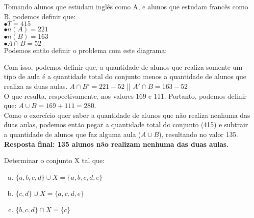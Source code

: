 \begin{solution}{}{}
    Tomando alunos que estudam inglês como A, e alunos que estudam francês como B, podemos definir que: \\
    $\bullet T = 415$ \\
    $\bullet  n(A)=221$ \\
    $\bullet n(B)=163$ \\
    $\bullet A\cap B = 52$ \\
    
    Podemos então definir o problema com este diagrama:


    Com isso, podemos definir que, a quantidade de alunos que realiza somente um tipo de aula é a quantidade total do conjunto menos a quantidade de alunos que realiza as duas aulas.
    $A\cap B' = 221 - 52$ || $A'\cap B = 163-52$ \\
    O que resulta, respectivamente, nos valores 169 e 111. Portanto, podemos definir que: $A\cup B=169+111=280$. \\
    Como o exercício quer saber a quantidade de alunos que não realiza nenhuma das duas aulas, podemos então pegar a quantidade total do conjunto (415) e subtrair a quantidade de alunos que faz alguma aula ($A\cup B$), resultando no valor 135.\\
    \textbf{Resposta final: 135 alunos não realizam nenhuma das duas aulas.}
\end{solution}

\newpage
\begin{problem}{}{}
    Determinar o conjunto X tal que:
    \begin{enumerate}[(a)]
        \item $\{{a, b, c, d}\}\cup X =\{{a, b, c, d, e}\}$
        \item $\{{c, d}\}\cup X =\{{a, c, d, e}\}$
        \item $\{{b, c, d}\}\cap X =\{{c}\}$
    \end{enumerate}
\end{problem}

